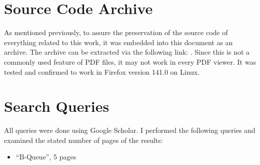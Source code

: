 \chapter{Source Code Archive}
\label{app:source-code-archive}
As mentioned previously, to assure the preservation of the source code of everything related to this work, it
was embedded into this document as an archive.
The archive can be extracted via the following link: .
Since this is not a commonly used feature of PDF files, it may not work in every PDF viewer.
It was tested and confirmed to work in Firefox version 141.0 on Linux.

\chapter{Search Queries}
\label{app:repro-search-queries}
All queries were done using Google Scholar.
I performed the following queries and examined the stated number of pages of the results:
\begin{itemize}
    \item ``B-Queue'', 5 pages
\end{itemize}




{
    \listoffigures

    \let\clearpage\relax
    \let\cleardoublepage\relax

    \listoflistings
}
